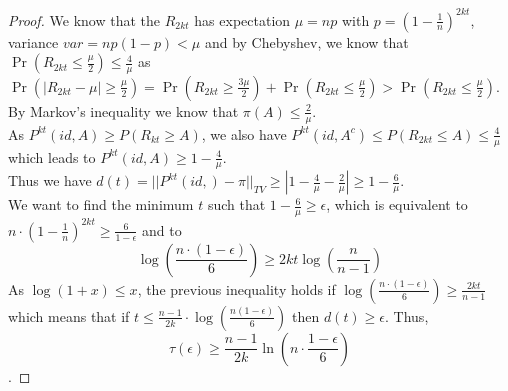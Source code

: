 \documentclass[conference]{IEEEtran}
\begin{document}
\begin{proof}
We know that the $R_{2kt}$ has expectation $\mu = np$  with $p=\left ( 1 - \frac{1}{n} \right )^{2kt}$, variance $var = np(1-p) <\mu$ and by Chebyshev, we know that $\Pr(R_{2kt}\leq \frac{\mu}{2})\leq \frac{4}{\mu}$
as $\Pr(|R_{2kt} - \mu|\geq \frac{\mu}{2}) = \Pr(R_{2kt} \geq \frac{3\mu}{2}) + \Pr(R_{2kt} \leq \frac{\mu}{2}) > \Pr(R_{2kt} \leq \frac{\mu}{2})$.\\

By Markov's inequality we know that $\pi(A) \leq \frac{2}{\mu}$.\\

As $P^{kt}(id,A) \geq P(R_{kt}\geq A) $, we also have $P^{kt}(id,A^c) \leq P(R_{2kt}\leq A) \leq \frac{4}{\mu} $ which leads to $P^{kt}(id,A)\geq1 - \frac{4}{\mu}$.\\

Thus we have $d(t)=||P^{kt}(id,) - \pi ||_{TV} \geq |1 - \frac{4}{\mu} - \frac{2}{\mu}| \geq 1 - \frac{6}{\mu}$.\\

We want to find the minimum $t$ such that $1-\frac{6}{\mu}\geq \epsilon$, which is equivalent to $n \cdot \left ( 1 - \frac{1}{n} \right )^{2kt} \geq \frac{6}{1-\epsilon}$ and to
$$\log\left(\frac{n\cdot (1-\epsilon)}{6}\right) \geq 2kt \log \left ( \frac{n}{n-1} \right )$$
As $\log(1+x) \leq x$, the previous inequality holds if $\log\left(\frac{n\cdot (1-\epsilon)}{6}\right) \geq   \frac{2kt}{n-1} $ which means that if $t\leq \frac{n-1}{2k}\cdot \log\left ( \frac{n(1-\epsilon)}{6}\right )$ then $d(t)\geq \epsilon$.
Thus,
$$\tau \left (\epsilon \right ) \geq \frac{n-1}{2k} \ln(n\cdot \frac{1-\epsilon}{6}) $$.
\end{proof}
\end{document}
